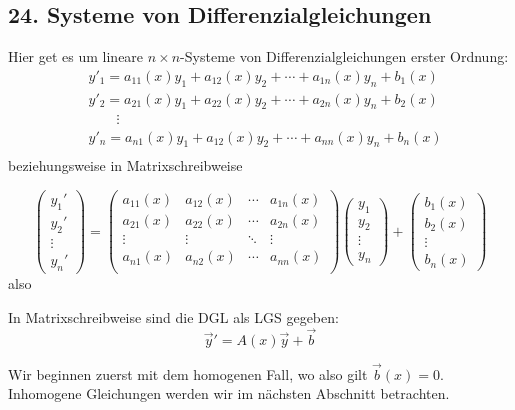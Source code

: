 \documentclass[a4paper,landscape,8pt]{extarticle}
\begin{document}
\begin{multicols*}{4}
\section{24. Systeme von Differenzialgleichungen}

\begin{warmup}
Hier get es um lineare $n\times n$-Systeme von Differenzialgleichungen erster
Ordnung:
\begin{align*}
&y'_1 = a_{11}(x)y_1 + a_{12}(x)y_2 + \cdots + a_{1n}(x)y_n + b_1(x)\\
&y'_2 = a_{21}(x)y_1 + a_{22}(x)y_2 + \cdots + a_{2n}(x)y_n + b_2(x)\\
&\qquad \vdots\\
&y'_n = a_{n1}(x)y_1 + a_{12}(x)y_2 + \cdots + a_{nn}(x)y_n + b_n(x)\\
\end{align*}
beziehungsweise in Matrixschreibweise
\end{warmup}
\begin{warmup}
\[
\begin{pmatrix}
y_1'\\
y_2'\\
\vdots\\
y_n'
\end{pmatrix}
=
\begin{pmatrix}
a_{11}(x) & a_{12}(x) & \cdots & a_{1n}(x)\\
a_{21}(x) & a_{22}(x) & \cdots & a_{2n}(x)\\
\vdots & \vdots & \ddots & \vdots\\
a_{n1}(x) & a_{n2}(x) & \cdots & a_{nn}(x)\\
\end{pmatrix}
\begin{pmatrix}
y_1\\
y_2\\
\vdots\\
y_n
\end{pmatrix}
+
\begin{pmatrix}
b_1(x)\\
b_2(x)\\
\vdots\\
b_n(x)
\end{pmatrix}
\]
also
\end{warmup}

In Matrixschreibweise sind die DGL als LGS gegeben:
\[
\vec{y}' = A(x)\vec{y} + \vec{b}
\]
\begin{warmup}
Wir beginnen zuerst mit dem homogenen Fall, wo also gilt $\vec{b}(x) = 0$.
Inhomogene Gleichungen werden wir im nächsten Abschnitt betrachten.
\end{warmup}



\end{multicols*}
\end{document}
